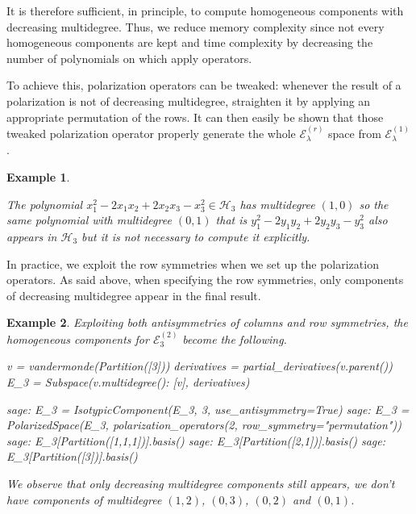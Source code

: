\documentclass[letter,12pt]{article}
\newtheorem{example}{Example}
\begin{document}
	It is therefore sufficient, in principle, to compute homogeneous components with decreasing multidegree. Thus, we reduce memory complexity since not every homogeneous components are kept and time complexity by decreasing the number of polynomials on which apply operators. 
	
	To achieve this, polarization operators can be tweaked: whenever the result of a polarization is not of decreasing multidegree, straighten it by applying an appropriate permutation of the rows. It can then easily be shown that those tweaked polarization operator properly generate the whole $\mathcal{E}_\lambda^{(r)}$ space from $\mathcal{E}_\lambda^ {(1)}$.
	
	\begin{example} ~ 
		
		The polynomial $x_1^2 - 2x_1x_2 + 2x_2x_3 - x_3^2 \in \mathcal{H}_{3}$ has multidegree $(1,0)$ so the same polynomial with multidegree $(0,1)$ that is $y_1^2 - 2y_1y_2 + 2y_2y_3 - y_3^2$ also appears in $\mathcal{H}_{3}$ but it is not necessary to compute it explicitly.  
	\end{example}

	In practice, we exploit the row symmetries when we set up the polarization operators. As said above, when specifying the row symmetries, only components of decreasing multidegree appear in the final result. 
	
	\begin{example} Exploiting both antisymmetries of columns and row symmetries, the homogeneous components for $\mathcal{E}_3^{(2)}$ become the following.
		\begin{sagesilent}
			v = vandermonde(Partition([3]))
			derivatives = partial_derivatives(v.parent())
			E_3 = Subspace({v.multidegree(): [v]}, derivatives)
		\end{sagesilent}
		\begin{sagecommandline}
			sage: E_3 = IsotypicComponent(E_3, 3, use_antisymmetry=True)
			sage: E_3 = PolarizedSpace(E_3, polarization_operators(2, row_symmetry="permutation"))
			sage: E_3[Partition([1,1,1])].basis()
			sage: E_3[Partition([2,1])].basis()
			sage: E_3[Partition([3])].basis()
		\end{sagecommandline}	
	We observe that only decreasing multidegree components still appears, we don't have components of multidegree $(1,2)$, $(0,3)$, $(0,2)$ and $(0,1)$.
	\end{example}
	
\end{document}
